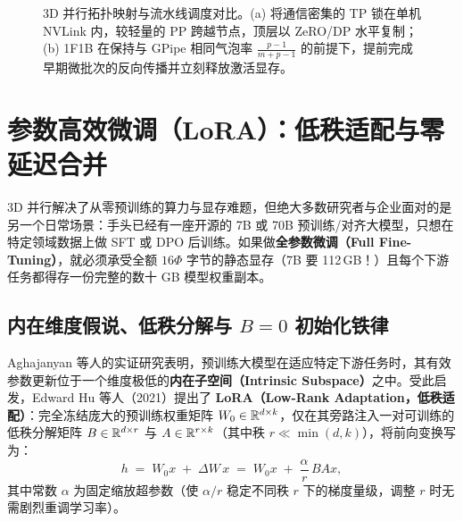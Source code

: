 \begin{figure}[htbp]
{%
}
\caption{3D 并行拓扑映射与流水线调度对比。(a) 将通信密集的 TP 锁在单机 NVLink 内，较轻量的 PP 跨越节点，顶层以 ZeRO/DP 水平复制；(b) 1F1B 在保持与 GPipe 相同气泡率 $\frac{p-1}{m+p-1}$ 的前提下，提前完成早期微批次的反向传播并立刻释放激活显存。}
\label{fig:3d-parallel-and-1f1b}
\end{figure}

\section{参数高效微调（LoRA）：低秩适配与零延迟合并}
\label{sec:lora}

3D 并行解决了从零预训练的算力与显存难题，但绝大多数研究者与企业面对的是另一个日常场景：手头已经有一座开源的 7B 或 70B 预训练/对齐大模型，只想在特定领域数据上做 SFT 或 DPO 后训练。如果做\textbf{全参数微调（Full Fine-Tuning）}，就必须承受全额 $16\Phi$ 字节的静态显存（7B 要 112\,GB！）且每个下游任务都得存一份完整的数十 GB 模型权重副本。

\subsection{内在维度假说、低秩分解与 $B = 0$ 初始化铁律}

Aghajanyan 等人的实证研究表明，预训练大模型在适应特定下游任务时，其有效参数更新位于一个维度极低的\textbf{内在子空间（Intrinsic Subspace）}之中。受此启发，Edward Hu 等人（2021）提出了 \textbf{LoRA（Low-Rank Adaptation，低秩适配）}：完全冻结庞大的预训练权重矩阵 $W_0 \in \mathbb{R}^{d \times k}$，仅在其旁路注入一对可训练的低秩分解矩阵 $B \in \mathbb{R}^{d \times r}$ 与 $A \in \mathbb{R}^{r \times k}$（其中秩 $r \ll \min(d, k)$），将前向变换写为：
\begin{equation}
  h \;=\; W_0 x \;+\; \Delta W\, x \;=\; W_0 x \;+\; \frac{\alpha}{r}\, B A x,
  \label{eq:lora-forward}
\end{equation}
其中常数 $\alpha$ 为固定缩放超参数（使 $\alpha / r$ 稳定不同秩 $r$ 下的梯度量级，调整 $r$ 时无需剧烈重调学习率）。

